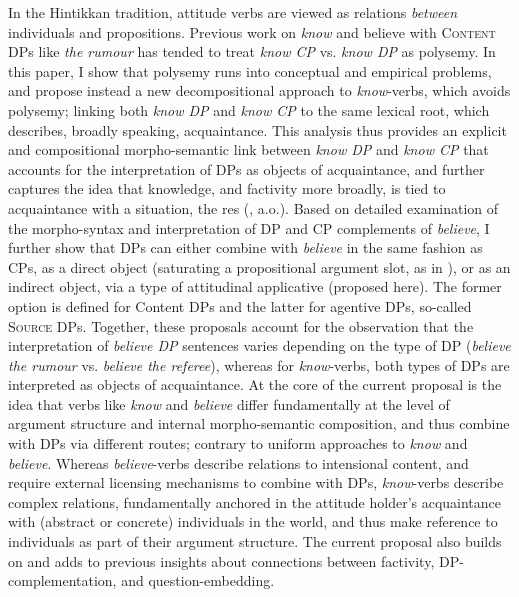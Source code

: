 In the Hintikkan tradition, attitude verbs are viewed as relations \textit{between} individuals and propositions. Previous work on \textit{know} and believe with \textsc{Content DP}s like \textit{the rumour} has tended to treat \textit{know CP} vs. \textit{know DP} as polysemy. In this paper, I show that polysemy runs into conceptual and empirical problems, and propose instead a new decompositional approach to \textit{know}-verbs, which avoids polysemy; linking both \textit{know DP} and \textit{know CP} to the same lexical root, which describes, broadly speaking, acquaintance. This analysis thus provides an explicit and compositional morpho-semantic link between \textit{know DP} and \textit{know CP} that accounts for the interpretation of DPs as objects of acquaintance, and further captures the idea that knowledge, and factivity more broadly, is tied to acquaintance with a situation, the res (\cite{kratzer2002-lingphil}, a.o.). Based on detailed examination of the morpho-syntax and interpretation of DP and CP complements of \textit{believe}, I further show that DPs can either combine with \textit{believe} in the same fashion as CPs, as a direct object (saturating a propositional argument slot, as in \cite{uegaki2016-jsem}), or as an indirect object, via a type of attitudinal applicative (proposed here). The former option is defined for Content DPs and the latter for agentive DPs, so-called \textsc{Source DP}s. Together, these proposals account for the observation that the interpretation of \textit{believe DP} sentences varies depending on the type of DP (\textit{believe the rumour} vs. \textit{believe the referee}), whereas for \textit{know}-verbs, both types of DPs are interpreted as objects of acquaintance. At the core of the current proposal is the idea that verbs like \textit{know} and \textit{believe} differ fundamentally at the level of argument structure and internal morpho-semantic composition, and thus combine with DPs via different routes; contrary to uniform approaches to \textit{know} and \textit{believe}. Whereas \textit{believe}-verbs describe relations to intensional content, and require external licensing mechanisms to combine with DPs, \textit{know}-verbs describe complex relations, fundamentally anchored in the attitude holder’s acquaintance with (abstract or concrete) individuals in the world, and thus make reference to individuals as part of their argument structure. The current proposal also builds on and adds to previous insights about connections between factivity, DP-complementation, and question-embedding.
\endinput